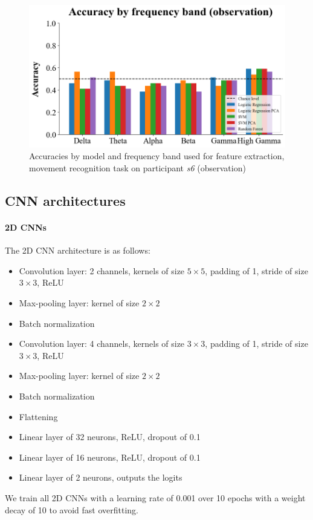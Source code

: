 \documentclass[10pt,conference,compsocconf]{IEEEtran}
\begin{document}
\begin{figure}[h!]
    \center
    \includegraphics[width=\linewidth]{../Code/figures/s6_accuracies_obs_freq_bands.png}
    \caption{Accuracies by model and frequency band used for feature extraction, movement recognition task on participant \textit{s6} (observation)}
    \label{appfig:accuracies_obs_freq_bands}
\end{figure}
\FloatBarrier

\subsection{CNN architectures}
\label{subsec:cnnarchi}
\paragraph{2D CNNs}
The 2D CNN architecture is as follows:
\begin{itemize}
  \item Convolution layer: 2 channels, kernels of size \(5\times 5\), padding of 1, stride of size \(3\times 3\), ReLU
  \item Max-pooling layer: kernel of size \(2\times 2\)
  \item Batch normalization
  \item Convolution layer: 4 channels, kernels of size \(3\times 3\), padding of 1, stride of size \(3\times 3\), ReLU
  \item Max-pooling layer: kernel of size \(2\times 2\)
  \item Batch normalization
  \item Flattening
  \item Linear layer of 32 neurons, ReLU, dropout of 0.1
  \item Linear layer of 16 neurons, ReLU, dropout of 0.1
  \item Linear layer of 2 neurons, outputs the logits
\end{itemize}
We train all 2D CNNs with a learning rate of 0.001 over 10 epochs with a weight decay of 10 to avoid fast overfitting.
\end{document}
